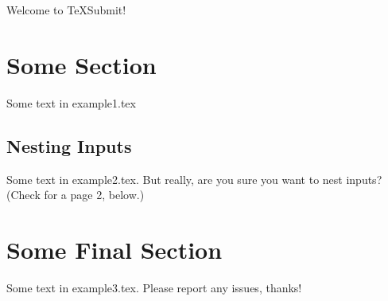 \documentclass{article}
\begin{document}
  Welcome to \TeX Submit!

  \section{Some Section}
    Some text in example1.tex

  \subsection{Nesting Inputs}
    Some text in example2.tex. But really, are you sure you want to nest inputs? (Check for a page 2, below.)

\clearpage
  \section{Some Final Section}

    Some text in example3.tex. Please report any issues, thanks!
\clearpage
\end{document}
